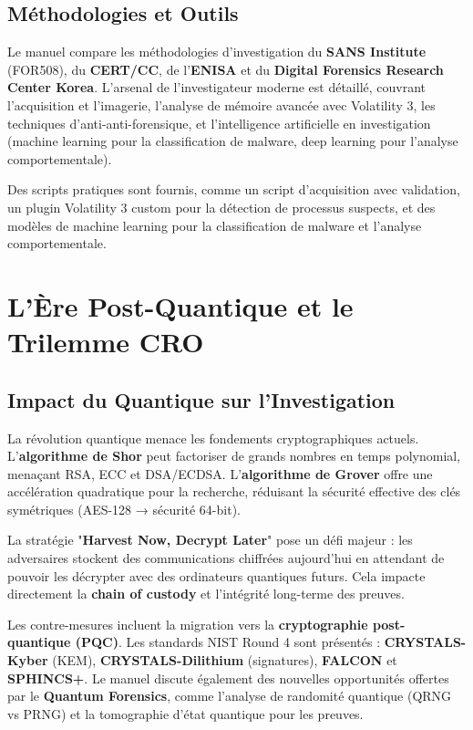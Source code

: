 \documentclass[12pt, a4paper]{article}
\begin{document}
\subsection{Méthodologies et Outils}
Le manuel compare les méthodologies d'investigation du \textbf{SANS Institute} (FOR508), du \textbf{CERT/CC}, de l'\textbf{ENISA} et du \textbf{Digital Forensics Research Center Korea}. L'arsenal de l'investigateur moderne est détaillé, couvrant l'acquisition et l'imagerie, l'analyse de mémoire avancée avec Volatility 3, les techniques d'anti-anti-forensique, et l'intelligence artificielle en investigation (machine learning pour la classification de malware, deep learning pour l'analyse comportementale).

Des scripts pratiques sont fournis, comme un script d'acquisition avec validation, un plugin Volatility 3 custom pour la détection de processus suspects, et des modèles de machine learning pour la classification de malware et l'analyse comportementale.

\section{L'Ère Post-Quantique et le Trilemme CRO}

\subsection{Impact du Quantique sur l'Investigation}
La révolution quantique menace les fondements cryptographiques actuels. L'\textbf{algorithme de Shor} peut factoriser de grands nombres en temps polynomial, menaçant RSA, ECC et DSA/ECDSA. L'\textbf{algorithme de Grover} offre une accélération quadratique pour la recherche, réduisant la sécurité effective des clés symétriques (AES-128 → sécurité 64-bit).

La stratégie "\textbf{Harvest Now, Decrypt Later}" pose un défi majeur : les adversaires stockent des communications chiffrées aujourd'hui en attendant de pouvoir les décrypter avec des ordinateurs quantiques futurs. Cela impacte directement la \textbf{chain of custody} et l'intégrité long-terme des preuves.

Les contre-mesures incluent la migration vers la \textbf{cryptographie post-quantique (PQC)}. Les standards NIST Round 4 sont présentés : \textbf{CRYSTALS-Kyber} (KEM), \textbf{CRYSTALS-Dilithium} (signatures), \textbf{FALCON} et \textbf{SPHINCS+}. Le manuel discute également des nouvelles opportunités offertes par le \textbf{Quantum Forensics}, comme l'analyse de randomité quantique (QRNG vs PRNG) et la tomographie d'état quantique pour les preuves.
\end{document}
